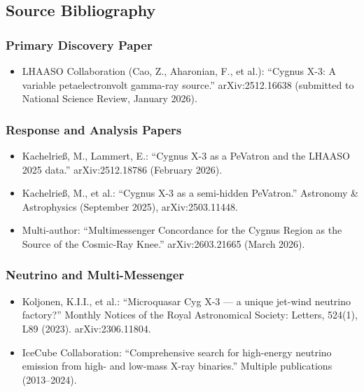 \documentclass[11pt,letterpaper]{article}
\begin{document}
\subsection{Source Bibliography}

\subsubsection{Primary Discovery Paper}
\begin{itemize}[noitemsep]
  \item LHAASO Collaboration (Cao, Z., Aharonian, F., et al.): ``Cygnus X-3: A variable petaelectronvolt gamma-ray source.'' arXiv:2512.16638 (submitted to National Science Review, January 2026).
\end{itemize}

\subsubsection{Response and Analysis Papers}
\begin{itemize}[noitemsep]
  \item Kachelrieß, M., Lammert, E.: ``Cygnus X-3 as a PeVatron and the LHAASO 2025 data.'' arXiv:2512.18786 (February 2026).
  \item Kachelrieß, M., et al.: ``Cygnus X-3 as a semi-hidden PeVatron.'' Astronomy \& Astrophysics (September 2025), arXiv:2503.11448.
  \item Multi-author: ``Multimessenger Concordance for the Cygnus Region as the Source of the Cosmic-Ray Knee.'' arXiv:2603.21665 (March 2026).
\end{itemize}

\subsubsection{Neutrino and Multi-Messenger}
\begin{itemize}[noitemsep]
  \item Koljonen, K.I.I., et al.: ``Microquasar Cyg X-3 --- a unique jet-wind neutrino factory?'' Monthly Notices of the Royal Astronomical Society: Letters, 524(1), L89 (2023). arXiv:2306.11804.
  \item IceCube Collaboration: ``Comprehensive search for high-energy neutrino emission from high- and low-mass X-ray binaries.'' Multiple publications (2013--2024).
\end{itemize}
\end{document}
